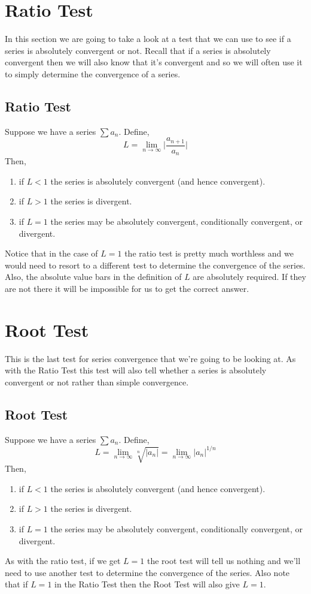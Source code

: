 \documentclass[10pt,reqno]{book}
\theoremstyle{definition}
\begin{document}
	\section{Ratio Test}
	
	In this section we are going to take a look at a test that we can use to see if a series is absolutely convergent or not. Recall that if a series is absolutely convergent then we will also know that it's convergent and so we will often use it to simply determine the convergence of a series. 
	
	\subsection*{Ratio Test}
	
	Suppose we have a series $ \sum a_n $. Define,
	\[ L = \lim\limits_{n \to \infty} \Bigg| \frac{a_{n+1}}{a_n} \Bigg| \]
	Then,
	\begin{enumerate}
		\item if $ L < 1 $ the series is absolutely convergent (and hence convergent).
		\item if $ L > 1 $ the series is divergent.
		\item if $ L = 1 $ the series may be absolutely convergent, conditionally convergent, or divergent.
	\end{enumerate}
	Notice that in the case of $ L = 1 $ the ratio test is pretty much worthless and we would need to resort to a different test to determine the convergence of the series. Also, the absolute value bars in the definition of $ L $ are absolutely required. If they are not there it will be impossible for us to get the correct answer.
	
	
	\section{Root Test}
	
	This is the last test for series convergence that we're going to be looking at. As with the Ratio Test this test will also tell whether a series is absolutely convergent or not rather than simple convergence.
	
	\subsection*{Root Test}
	
	Suppose we have a series $ \sum a_n $. Define,
	\[ L = \lim\limits_{n \to \infty} \sqrt[n]{|a_n|} = \lim\limits_{n \to \infty} |a_n|^{1/n} \]
	Then,
	\begin{enumerate}
		\item if $ L < 1 $ the series is absolutely convergent (and hence convergent).
		\item if $ L > 1 $ the series is divergent.
		\item if $ L = 1 $ the series may be absolutely convergent, conditionally convergent, or divergent.
	\end{enumerate}
	As with the ratio test, if we get $ L = 1 $ the root test will tell us nothing and we'll need to use another test to determine the convergence of the series. Also note that if $ L = 1 $ in the Ratio Test then the Root Test will also give $ L = 1 $.
	
\end{document}
